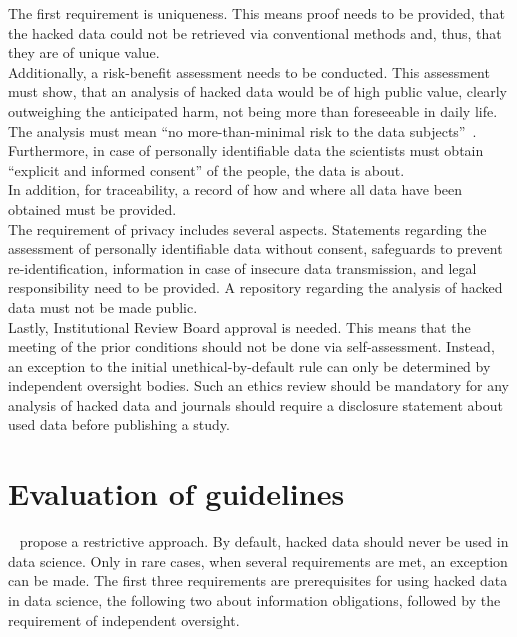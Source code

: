 The first requirement is uniqueness.
This means proof needs to be provided, that the hacked data could not be retrieved via conventional methods and, thus, that they are of unique value.\\
Additionally, a risk-benefit assessment needs to be conducted.
This assessment must show, that an analysis of hacked data would be of high public value, clearly outweighing the anticipated harm, not being more than foreseeable in daily life.
The analysis must mean ``no more-than-minimal risk to the data subjects''~\parencite[][747]{nature}.\\
Furthermore, in case of personally identifiable data the scientists must obtain ``explicit and informed consent'' of the people, the data is about.\\
In addition, for traceability, a record of how and where all data have been obtained must be provided.\\
The requirement of privacy includes several aspects.
Statements regarding the assessment of personally identifiable data without consent, safeguards to prevent re-identification, information in case of insecure data transmission, and legal responsibility need to be provided.
A repository regarding the analysis of hacked data must not be made public.\\
Lastly, Institutional Review Board approval is needed.
This means that the meeting of the prior conditions should not be done via self-assessment.
Instead, an exception to the initial unethical-by-default rule can only be determined by independent oversight bodies.
Such an ethics review should be mandatory for any analysis of hacked data and journals should require a disclosure statement about used data before publishing a study.

\section*{Evaluation of guidelines}

~\textcite{nature} propose a restrictive approach.
By default, hacked data should never be used in data science.
Only in rare cases, when several requirements are met, an exception can be made.
The first three requirements are prerequisites for using hacked data in data science, the following two about information obligations, followed by the requirement of independent oversight.

